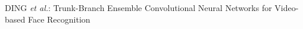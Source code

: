 \documentclass[10pt,journal,cspaper,compsoc]{IEEEtran}
\begin{document}
%
%



%
{DING \MakeLowercase{\textit{et al.}}: Trunk-Branch Ensemble Convolutional Neural Networks for Video-based Face Recognition}


%



\end{document}
